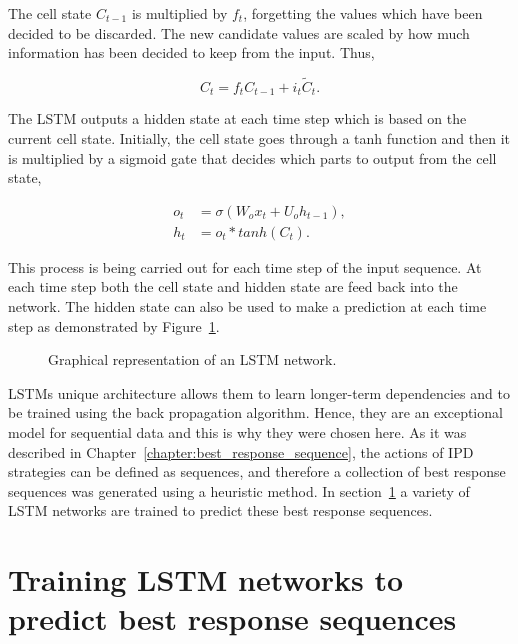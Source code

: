 The cell state \(C_{t-1}\) is multiplied by \(f_{t}\), forgetting the values
which have been decided to be discarded. The new candidate values are scaled by how
much information has been decided to keep from the input. Thus,

\begin{equation}\label{eq:cell_gate}
    C_{t} = f_{t} C_{t-1} + i_{t} \tilde{C}_{t}.
\end{equation}

The LSTM outputs a hidden state at each time step which is based on the current
cell state. Initially, the cell state goes through a tanh function and then it
is multiplied by a sigmoid gate that decides which parts to output from the cell
state,

\begin{align}\label{eq:outpu_gate}
    o_{t} & = \sigma(W_{o}x_{t} + U_{o}h_{t-1}), \\
    h_{t} & = o_{t} * tanh(C_{t}).
\end{align}

This process is being carried out for each time step of the input sequence. At
each time step both the cell state and hidden state are feed back into the
network. The hidden state can also be used to make a prediction at each time
step as demonstrated by Figure~\ref{fig:lstm}.

\begin{figure}[!htbp]
    \centering
    
    \caption{Graphical representation of an LSTM network.}\label{fig:lstm}
\end{figure}

LSTMs unique architecture allows them to learn longer-term dependencies and to
be trained using the back propagation algorithm. Hence, they are an exceptional
model for sequential data and this is why they were chosen here. As it was described in
Chapter~\ref{chapter:best_response_sequence}, the actions of IPD strategies can
be defined as sequences, and therefore a collection of best response sequences was
generated using a heuristic method. In section~\ref{section:training_a_rnn} a
variety of LSTM networks are trained to predict these best response sequences.

\section{Training LSTM networks to predict best response sequences}\label{section:training_a_rnn}

